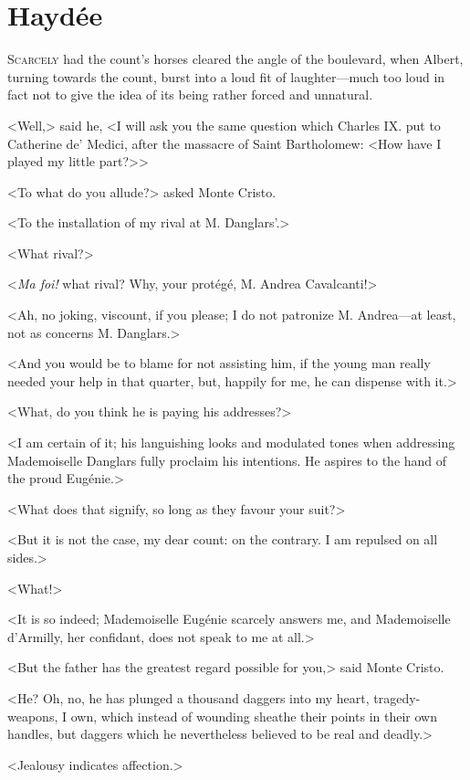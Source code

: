 \chapter{Haydée} 

 \lettrine{S}{carcely} had the count's horses cleared the angle of the boulevard, when Albert, turning towards the count, burst into a loud fit of laughter—much too loud in fact not to give the idea of its being rather forced and unnatural. 

 <Well,> said he, <I will ask you the same question which Charles IX. put to Catherine de' Medici, after the massacre of Saint Bartholomew: <How have I played my little part?>> 

 <To what do you allude?> asked Monte Cristo. 

 <To the installation of my rival at M. Danglars'.> 

 <What rival?> 

 <\textit{Ma foi!} what rival? Why, your protégé, M. Andrea Cavalcanti!> 

 <Ah, no joking, viscount, if you please; I do not patronize M. Andrea—at least, not as concerns M. Danglars.> 

 <And you would be to blame for not assisting him, if the young man really needed your help in that quarter, but, happily for me, he can dispense with it.> 

 <What, do you think he is paying his addresses?> 

 <I am certain of it; his languishing looks and modulated tones when addressing Mademoiselle Danglars fully proclaim his intentions. He aspires to the hand of the proud Eugénie.> 

 <What does that signify, so long as they favour your suit?> 

 <But it is not the case, my dear count: on the contrary. I am repulsed on all sides.> 

 <What!> 

 <It is so indeed; Mademoiselle Eugénie scarcely answers me, and Mademoiselle d'Armilly, her confidant, does not speak to me at all.> 

 <But the father has the greatest regard possible for you,> said Monte Cristo. 

 <He? Oh, no, he has plunged a thousand daggers into my heart, tragedy-weapons, I own, which instead of wounding sheathe their points in their own handles, but daggers which he nevertheless believed to be real and deadly.> 

 <Jealousy indicates affection.> 

